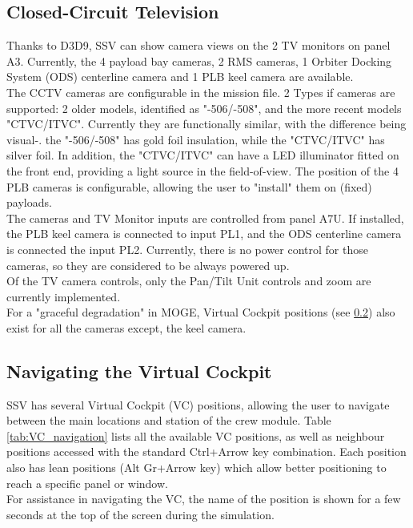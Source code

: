\documentclass[Space_Shuttle_Vessel_Manual.tex]{subfiles}
\begin{document}
\begin{multicols*}{2}
\subsection{Closed-Circuit Television}
Thanks to D3D9, SSV can show camera views on the 2 TV monitors on panel A3. Currently, the 4 payload bay cameras, 2 RMS cameras, 1 Orbiter Docking System (ODS) centerline camera and 1 PLB keel camera are available.\\
The CCTV cameras are configurable in the mission file. 2 Types if cameras are supported: 2 older models, identified as "-506/-508", and the more recent models "CTVC/ITVC". Currently they are functionally similar, with the difference being visual-. the "-506/-508" has gold foil insulation, while the "CTVC/ITVC" has silver foil. In addition, the "CTVC/ITVC" can have a LED illuminator fitted on the front end, providing a light source in the field-of-view. The position of the 4 PLB cameras is configurable, allowing the user to "install" them on (fixed) payloads.\\
The cameras and TV Monitor inputs are controlled from panel A7U. If installed, the PLB keel camera is connected to input PL1, and the ODS centerline camera is connected the input PL2. Currently, there is no power control for those cameras, so they are considered to be always powered up.\\
Of the TV camera controls, only the Pan/Tilt Unit controls and zoom are currently implemented.\\
For a "graceful degradation" in MOGE, Virtual Cockpit positions (see \ref{sec:nav-vc}) also exist for all the cameras except, the keel camera.



\subsection{Navigating the Virtual Cockpit}
\label{sec:nav-vc}
SSV has several Virtual Cockpit (VC) positions, allowing the user to navigate between the main locations and station of the crew module. Table \ref{tab:VC_navigation} lists all the available VC positions, as well as neighbour positions accessed with the standard Ctrl+Arrow key combination. Each position also has lean positions (Alt Gr+Arrow key) which allow better positioning to reach a specific panel or window.\\
For assistance in navigating the VC, the name of the position is shown for a few seconds at the top of the screen during the simulation.
\\

\end{multicols*}
\end{document}
